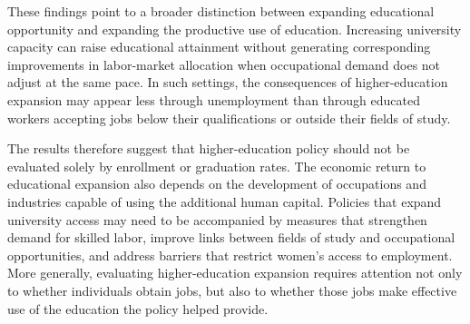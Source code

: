 These findings point to a broader distinction between expanding educational opportunity and expanding the productive use of education. Increasing university capacity can raise educational attainment without generating corresponding improvements in labor-market allocation when occupational demand does not adjust at the same pace. In such settings, the consequences of higher-education expansion may appear less through unemployment than through educated workers accepting jobs below their qualifications or outside their fields of study.

The results therefore suggest that higher-education policy should not be evaluated solely by enrollment or graduation rates. The economic return to educational expansion also depends on the development of occupations and industries capable of using the additional human capital. Policies that expand university access may need to be accompanied by measures that strengthen demand for skilled labor, improve links between fields of study and occupational opportunities, and address barriers that restrict women's access to employment. More generally, evaluating higher-education expansion requires attention not only to whether individuals obtain jobs, but also to whether those jobs make effective use of the education the policy helped provide.
